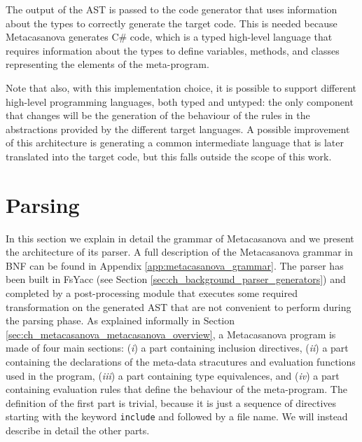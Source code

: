 The output of the AST is passed to the code generator that uses information about the types to correctly generate the target code. This is needed because Metacasanova generates C\# code, which is a typed high-level language that requires information about the types to define variables, methods, and classes representing the elements of the meta-program.

Note that also, with this implementation choice, it is possible to support different high-level programming languages, both typed and untyped: the only component that changes will be the generation of the behaviour of the rules in the abstractions provided by the different target languages. A possible improvement of this architecture is generating a common intermediate language that is later translated into the target code, but this falls outside the scope of this work.


\section{Parsing}
\label{sec:ch_metacasanova_parsing}
In this section we explain in detail the grammar of Metacasanova and we present the architecture of its parser. A full description of the Metacasanova grammar in BNF can be found in Appendix \ref{app:metacasanova_grammar}. The parser has been built in FsYacc (see Section \ref{sec:ch_background_parser_generators}) and completed by a post-processing module that executes some required transformation on the generated AST that are not convenient to perform during the parsing phase. As explained informally in Section \ref{sec:ch_metacasanova_metacasanova_overview}, a Metacasanova program is made of four main sections: (\textit{i}) a part containing inclusion directives, (\textit{ii}) a part containing the declarations of the meta-data stracutures and evaluation functions used in the program, (\textit{iii}) a part containing type equivalences, and (\textit{iv}) a part containing evaluation rules that define the behaviour of the meta-program. The definition of the first part is trivial, because it is just a sequence of directives starting with the keyword \texttt{include} and followed by a file name. We will instead describe in detail the other parts.
	
